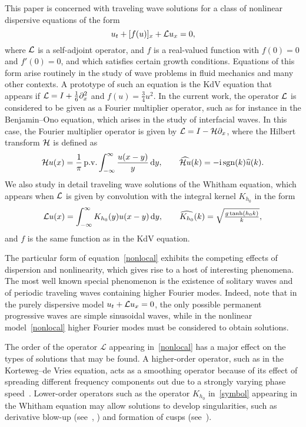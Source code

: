 This paper is concerned with traveling wave solutions for a class of nonlinear dispersive
equations of the form
\begin{equation}\label{nonlocal}
u_t + [f(u)]_x + \mathcal{L} u_x = 0,
\end{equation}
where $\mathcal{L}$ is a self-adjoint operator, and $f$ is a real-valued function 
with $f(0)=0$ and $f'(0)=0$, and which satisfies certain growth conditions.
Equations of this form arise routinely in the study of wave problems in fluid mechanics
and many other contexts.
A prototype of such an equation is the KdV equation that appears
if $\mathcal{L}= I + \frac{1}{6} \partial_x^2$ and $f(u) = \frac{3}{4} u^2$.
In the current work, the operator $\mathcal{L}$ is considered to be given as a Fourier multiplier operator,
such as for instance in the Benjamin--Ono equation, which arises in the study of
interfacial waves. In this case, the Fourier multiplier operator is given by
$\mathcal{L} =  I - \mathcal{H} \partial_x$, where the Hilbert transform
$\mathcal{H}$ is defined as
\begin{equation}
\mathcal{H} u(x) = \frac{1}{\pi} \, \mathrm{p.v.} \int_{-\infty}^{\infty} \frac{u(x-y)}{y} \, \mathrm{d} y, 
\qquad \widehat{\mathcal{H} u}(k) = -\mathrm{i} \operatorname{sgn}(k)\widehat{u}(k).
\end{equation}
We also study in detail traveling wave solutions of the Whitham equation, which appears when 
$\mathcal{L}$ is given by convolution with the integral kernel $K_{h_0}$ in the form
\begin{equation}\label{symbol}
\mathcal{L} u(x) = \int_{-\infty}^{\infty} K_{h_0} (y) u(x-y) \, \mathrm{d} y,
\qquad \widehat{K_{h_0}} (k) 
= {\textstyle{ \sqrt{\frac{g\tanh (h_0 k)}{k}}}}, 
\end{equation}
and $f$ is the same function as in the KdV equation.

The particular form of equation~\eqref{nonlocal} exhibits the competing effects of dispersion and nonlinearity, 
which gives rise to a host of interesting phenomena. The most well known special phenomenon is the existence
of solitary waves and of periodic traveling waves containing higher Fourier modes.
Indeed, note that in the purely dispersive model $u_t + \mathcal{L} u_x = 0$, 
the only possible permanent progressive waves are simple sinusoidal waves, while
in the nonlinear model~\eqref{nonlocal} higher Fourier modes must be considered
to obtain solutions.

The order of the operator $\mathcal{L}$ appearing in~\eqref{nonlocal} 
has a major effect on the types of solutions that may be found. 
A higher-order operator, such as in the Korteweg--de Vries equation, 
acts as a smoothing operator because of its effect of spreading different frequency components
out due to a strongly varying phase speed~\cite{Kato}. Lower-order operators 
such as the operator $K_{h_0}$ in~\eqref{symbol} appearing in the Whitham equation
may allow solutions to develop singularities, such as derivative blow-up (see~\cite{Hur2015}, \cite{HurTao})
and formation of cusps (see~\cite{EW2016}).

